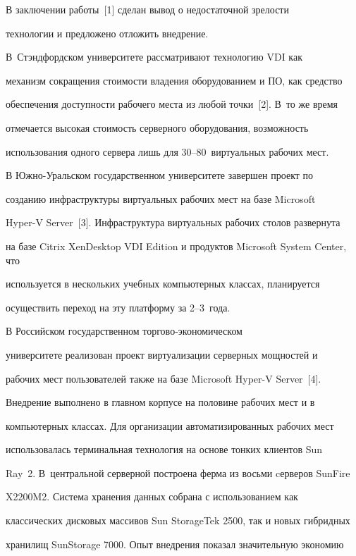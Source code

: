   В заключении работы~[1] сделан вывод о недостаточной зрелости 

технологии и предложено отложить внедрение. 

  

  В~Стэндфордском университете рассматривают технологию VDI как 

механизм сокращения стоимости владения оборудованием и ПО, как средство 

обеспечения доступности рабочего места из любой точки~[2]. В~то же время 

отмечается высокая стоимость серверного оборудования, возможность 

использования одного сервера лишь для 30--80~виртуальных рабочих мест. 

  

  В Южно-Уральском государственном университете завершен проект по 

созданию инфраструктуры виртуальных рабочих мест на базе Microsoft 

  Hyper-V Server~[3]. Инфраструктура виртуальных рабочих столов развернута 

на базе Citrix XenDesktop VDI Edition и продуктов Microsoft System Center, что 

используется в нескольких учебных компьютерных классах, планируется 

осуществить переход на эту платформу за 2--3~года. 

  

  В Российском государственном торгово-экономическом 

университете реализован проект виртуализации серверных мощностей и 

рабочих мест пользователей также на базе Microsoft Hyper-V Server~[4]. 

Внедрение выполнено в главном корпусе на половине рабочих мест и в 

компьютерных классах. Для организации автоматизированных рабочих мест 

использовалась терминальная технология на основе тонких клиентов Sun 

Ray~2. В~центральной серверной построена ферма из восьми cерверов SunFire 

X2200M2. Система хранения данных собрана с использованием как 

классических дисковых массивов Sun StorageTek 2500, так и новых гибридных 

хранилищ SunStorage 7000. Опыт внедрения показал значительную экономию 

